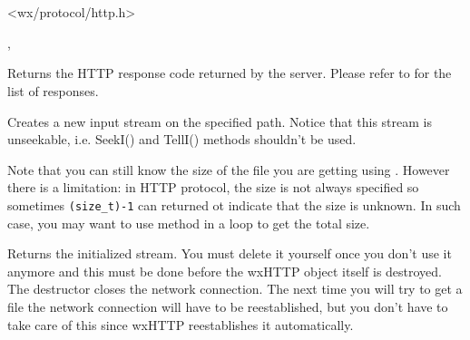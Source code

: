 \section{}\label{wxhttp}




<wx/protocol/http.h>




, 


\label{wxhttpgetresponse}


Returns the HTTP response code returned by the server. Please refer to
 for the list of responses.


\label{wxhttpgetinputstream}


Creates a new input stream on the specified path. Notice that this stream is
unseekable, i.e. SeekI() and TellI() methods shouldn't be used.

Note that you can still know the size of the file you are getting using 
. However there is a
limitation: in HTTP protocol, the size is not always specified so sometimes
\texttt{(size\_t)-1} can returned ot indicate that the size is unknown. In such
case, you may want to use  
method in a loop to get the total size.


Returns the initialized stream. You must delete it yourself once you
don't use it anymore and this must be done before the wxHTTP object itself is
destroyed. The destructor closes the network connection. The next time you will
try to get a file the network connection will have to be reestablished, but you
don't have to take care of this since wxHTTP reestablishes it automatically.

